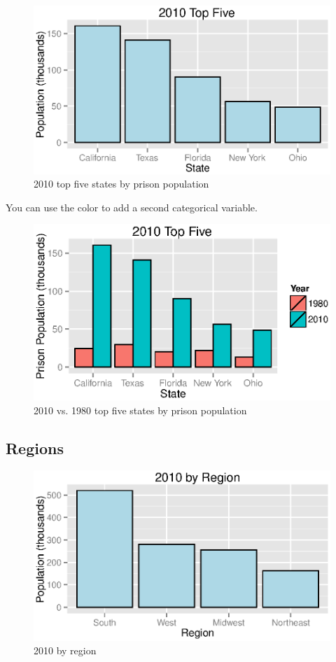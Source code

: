 \documentclass{exam}
\begin{document}
  \begin{figure}[H]
    \centering
    \includegraphics[scale = 0.9]{figures/top_five_2010.eps}
    \caption{2010 top five states by prison population}
  \end{figure}

  You can use the color to add a second categorical variable.
  \begin{figure}[H]
    \centering
    \includegraphics[scale = 0.9]{figures/1980_to_2010_top_five.eps}
    \caption{2010 vs. 1980 top five states by prison population}
  \end{figure}

  \subsection{Regions}
  \begin{figure}[H]
    \centering
    \includegraphics[scale = 0.9]{figures/regions_2010.eps}
    \caption{2010 by region}
  \end{figure}
\end{document}
